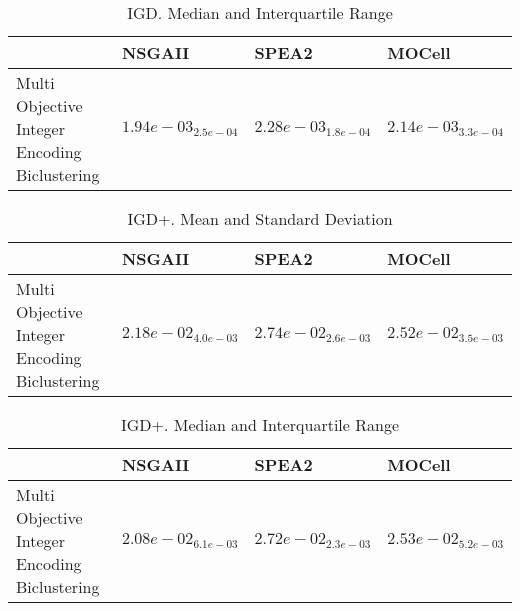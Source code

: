 \documentclass{article}
\begin{document}
\begin{table}
\caption{IGD. Median and Interquartile Range}
\label{table: IGD}
\centering
\begin{scriptsize}
\begin{tabular}{llll}
\hline & NSGAII & SPEA2 &  MOCell\\
\hline 
Multi Objective Integer Encoding Biclustering & \cellcolor{gray95}$  1.94e-03_{ 2.5e-04}$ & $  2.28e-03_{ 1.8e-04}$ & \cellcolor{gray25}$  2.14e-03_{ 3.3e-04}$ \\
\hline
\end{tabular}
\end{scriptsize}
\end{table}

\begin{table}
\caption{IGD+. Mean and Standard Deviation}
\label{table: IGD+}
\centering
\begin{scriptsize}
\begin{tabular}{llll}
\hline & NSGAII & SPEA2 &  MOCell\\
\hline 
Multi Objective Integer Encoding Biclustering & \cellcolor{gray95}$  2.18e-02_{ 4.0e-03}$ & $  2.74e-02_{ 2.6e-03}$ & \cellcolor{gray25}$  2.52e-02_{ 3.5e-03}$ \\
\hline
\end{tabular}
\end{scriptsize}
\end{table}

\begin{table}
\caption{IGD+. Median and Interquartile Range}
\label{table: IGD+}
\centering
\begin{scriptsize}
\begin{tabular}{llll}
\hline & NSGAII & SPEA2 &  MOCell\\
\hline 
Multi Objective Integer Encoding Biclustering & \cellcolor{gray95}$  2.08e-02_{ 6.1e-03}$ & $  2.72e-02_{ 2.3e-03}$ & \cellcolor{gray25}$  2.53e-02_{ 5.2e-03}$ \\
\hline
\end{tabular}
\end{scriptsize}
\end{table}
\end{document}
